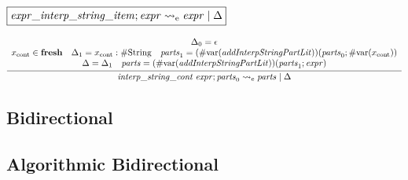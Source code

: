 $\fbox{$\mathit{expr\_interp\_string\_item}; \mathit{expr} \rightsquigarrow_\mathrm{e} \mathit{expr} \mid \Delta$}$

\begin{gather*}
    \infer{\mathit{interp\_string\_cont}\; \mathit{expr}; \mathit{parts}_0 \rightsquigarrow_\mathrm{e} \mathit{parts} \mid \Delta}{
        \begin{array}{c}
            \Delta_0 = \epsilon
            \\
            x_\mathrm{cont} \in \mathbf{fresh}
            \hspace{1em}
            \Delta_1 = x_\mathrm{cont}: \mathrm{\#String}
            \hspace{1em}
            \mathit{parts}_1 = (\mathrm{\#var}(\mathit{addInterpStringPartLit}))(\mathit{parts}_0; \mathrm{\#var}(x_\mathrm{cont}))
            \\
            \Delta = \Delta_1
            \hspace{1em}
            \mathit{parts} = (\mathrm{\#var}(\mathit{addInterpStringPartLit}))(\mathit{parts}_1; \mathit{expr})
        \end{array}
    }
\end{gather*}

\subsection{Bidirectional}

\subsection{Algorithmic Bidirectional}
